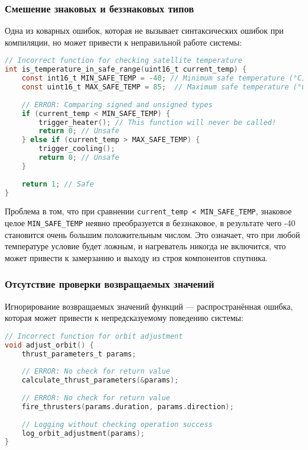 \subsubsection{Смешение знаковых и беззнаковых типов}

Одна из коварных ошибок, которая не вызывает синтаксических ошибок при компиляции, но может привести к неправильной работе системы\cite{nerdyelectronics}:

\begin{lstlisting}[language=C, caption=Опасное смешение знаковых и беззнаковых типов]
// Incorrect function for checking satellite temperature
int is_temperature_in_safe_range(uint16_t current_temp) {
    const int16_t MIN_SAFE_TEMP = -40; // Minimum safe temperature (°C)
    const uint16_t MAX_SAFE_TEMP = 85;  // Maximum safe temperature (°C)
    
    // ERROR: Comparing signed and unsigned types
    if (current_temp < MIN_SAFE_TEMP) {
        trigger_heater(); // This function will never be called!
        return 0; // Unsafe
    } else if (current_temp > MAX_SAFE_TEMP) {
        trigger_cooling();
        return 0; // Unsafe
    }
    
    return 1; // Safe
}
\end{lstlisting}

Проблема в том, что при сравнении \texttt{current\_temp < MIN\_SAFE\_TEMP}, знаковое целое \texttt{MIN\_SAFE\_TEMP} неявно преобразуется в беззнаковое, в результате чего -40 становится очень большим положительным числом. Это означает, что при любой температуре условие будет ложным, и нагреватель никогда не включится, что может привести к замерзанию и выходу из строя компонентов спутника.

\subsubsection{Отсутствие проверки возвращаемых значений}

Игнорирование возвращаемых значений функций — распространённая ошибка, которая может привести к непредсказуемому поведению системы\cite{reddit_cpp}:

\begin{lstlisting}[language=C, caption=Игнорирование возвращаемых значений функций]
// Incorrect function for orbit adjustment
void adjust_orbit() {
    thrust_parameters_t params;
    
    // ERROR: No check for return value
    calculate_thrust_parameters(&params);
    
    // ERROR: No check for return value
    fire_thrusters(params.duration, params.direction);
    
    // Logging without checking operation success
    log_orbit_adjustment(params);
}
\end{lstlisting}

